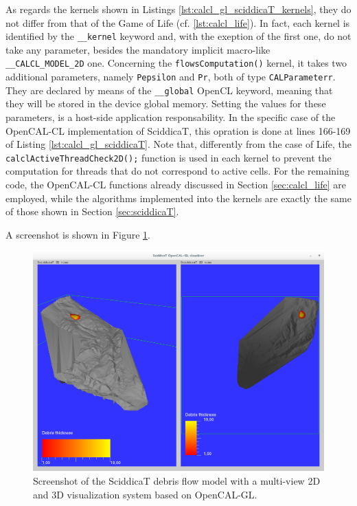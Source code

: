 As regards the kernels shown in Listings
\ref{lst:calcl_gl_sciddicaT_kernels}, they do not differ from that of
the Game of Life (cf. \ref{lst:calcl_life}). In fact, each kernel is
identified by the \verb'__kernel' keyword and, with the exeption of
the first one, do not take any parameter, besides the mandatory
implicit macro-like \verb'__CALCL_MODEL_2D' one. Concerning the
\verb'flowsComputation()' kernel, it takes two additional parameters,
namely \verb'Pepsilon' and \verb'Pr', both of type
\verb'CALParameterr'. They are declared by means of the
\verb'__global' OpenCL keyword, meaning that they will be stored in
the device global memory. Setting the values for these parameters, is
a host-side application responsability. In the specific case of the
OpenCAL-CL implementation of SciddicaT, this opration is done at lines
166-169 of Listing \ref{lst:calcl_gl_sciddicaT}. Note that,
differently from the case of Life, the
\verb'calclActiveThreadCheck2D();' function is used in each kernel to
prevent the computation for threads that do not correspond to active
cells. For the remaining code, the OpenCAL-CL functions already
discussed in Section \ref{sec:calcl_life} are employed, while
the algorithms implemented into the kernels are exactly the same of
those shown in Section \ref{sec:sciddicaT}.

A screenshot is shown in Figure \ref{fig:calgl_sciddicaT1}.

\begin{figure}
  \begin{center}
    \includegraphics[width=12cm]{./images/OpenCAL/calgl_sciddicaT1}
    \caption{Screenshot of the SciddicaT debris flow model with a
      multi-view 2D and 3D visualization system based on OpenCAL-GL.}
    \label{fig:calgl_sciddicaT1}
  \end{center}
\end{figure}


